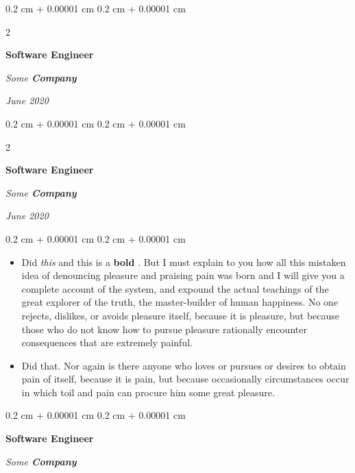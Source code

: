 \documentclass[10pt, letterpaper]{article}
\newenvironment{highlights}{
    \begin{itemize}[
        topsep=0.10 cm,
        parsep=0.10 cm,
        partopsep=0pt,
        itemsep=0pt,
        leftmargin=0.4 cm + 10pt
    ]
}{
    \end{itemize}
} %
\newenvironment{onecolentry}{
    \begin{adjustwidth}{
        0.2 cm + 0.00001 cm
    }{
        0.2 cm + 0.00001 cm
    }
}{
    \end{adjustwidth}
} %
\newenvironment{twocolentry}[2][]{
    \onecolentry
    \def\secondColumn{#2}
    \setcolumnwidth{\fill, 4.5 cm}
    \begin{paracol}{2}
}{
    \switchcolumn \raggedleft \secondColumn
    \end{paracol}
    \endonecolentry
} %
\let\hrefWithoutArrow\href
\renewcommand{\href}[2]{\hrefWithoutArrow{#1}{\ifthenelse{\equal{#2}{}}{ }{#2 }\raisebox{.15ex}{\footnotesize \faExternalLink*}}}
\begin{document}
        \vspace{0.2 cm}

        \begin{twocolentry}{
            
            
        \textit{June 2020}}
            \textbf{Software Engineer}
            
            \textit{Some \textbf{Company}}
        \end{twocolentry}



        \vspace{0.2 cm}

        \begin{twocolentry}{
            
            
        \textit{June 2020}}
            \textbf{Software Engineer}
            
            \textit{Some \textbf{Company}}
        \end{twocolentry}

        \vspace{0.10 cm}
        \begin{onecolentry}
            \begin{highlights}
                \item Did \textit{this} and this is a \textbf{bold} \href{https://example.com}{link}. But I must explain to you how all this mistaken idea of denouncing pleasure and praising pain was born and I will give you a complete account of the system, and expound the actual teachings of the great explorer of the truth, the master-builder of human happiness. No one rejects, dislikes, or avoids pleasure itself, because it is pleasure, but because those who do not know how to pursue pleasure rationally encounter consequences that are extremely painful.
                \item Did that. Nor again is there anyone who loves or pursues or desires to obtain pain of itself, because it is pain, but because occasionally circumstances occur in which toil and pain can procure him some great pleasure.
            \end{highlights}
        \end{onecolentry}


        \vspace{0.2 cm}

        \begin{onecolentry}
            \textbf{Software Engineer}
            
            \textit{Some \textbf{Company}}
        \end{onecolentry}
\end{document}
